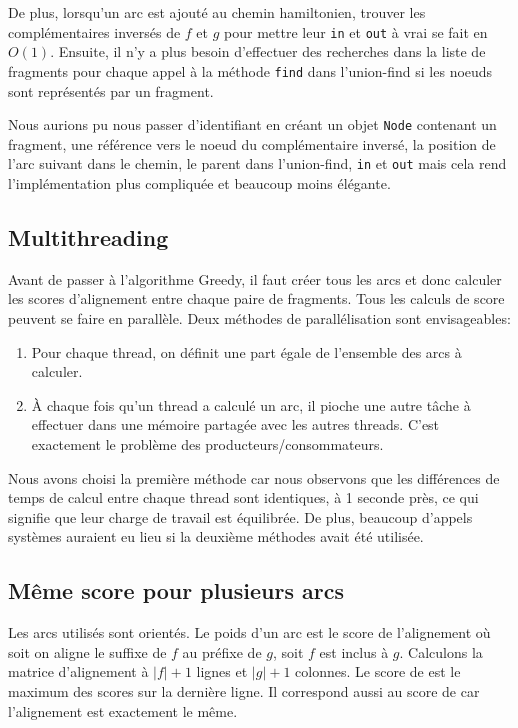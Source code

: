 De plus, lorsqu'un arc  est ajouté au chemin hamiltonien,
trouver les complémentaires inversés de $f$ et $g$ pour mettre
leur \texttt{in} et \texttt{out} à vrai se fait en $O(1)$.
Ensuite, il n'y a plus besoin d'effectuer des recherches dans
la liste de fragments pour chaque appel à la méthode \texttt{find}
dans l'union-find si les noeuds sont représentés par un fragment.

Nous aurions pu nous passer d'identifiant en créant un objet \texttt{Node}
contenant un fragment, une référence vers le noeud du complémentaire inversé,
la position de l'arc suivant dans le chemin,
le parent dans l'union-find, \texttt{in} et \texttt{out} mais
cela rend l'implémentation plus compliquée et beaucoup moins élégante.

\subsection{Multithreading}\label{multithreading}
Avant de passer à l'algorithme Greedy, il faut créer tous les arcs et donc
calculer les scores d'alignement entre chaque paire de fragments.
Tous les calculs de score peuvent se faire en parallèle.
Deux méthodes de parallélisation sont envisageables:
\begin{enumerate}
\item Pour chaque thread, on définit une part égale de l'ensemble des arcs à calculer.
\item À chaque fois qu'un thread a calculé un arc, il pioche une autre tâche à
	effectuer dans une mémoire partagée avec les autres threads.
	C'est exactement le problème des producteurs/consommateurs. %
\end{enumerate}
Nous avons choisi la première méthode car nous observons que les différences
de temps de calcul entre chaque thread sont identiques, à 1 seconde près,
ce qui signifie que leur charge de travail est équilibrée.
De plus, beaucoup d'appels systèmes auraient eu lieu si la deuxième méthodes
avait été utilisée.

\subsection{Même score pour plusieurs arcs}\label{sec:1m4s}
Les arcs utilisés sont orientés. Le poids d'un arc  est
le score de l'alignement où soit on aligne le suffixe de $f$ au préfixe de $g$,
soit $f$ est inclus à $g$. Calculons la matrice d'alignement à $|f|+1$ lignes et $|g|+1$ colonnes.
Le score de  est le maximum des scores sur la dernière ligne.
Il correspond aussi au score de  car l'alignement est exactement le même.\\

